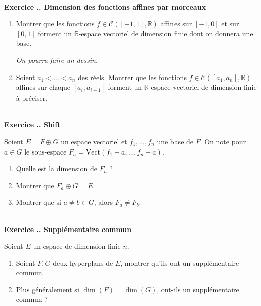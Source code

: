 \documentclass{article}
\newcommand{\mb}[1]{\mathbb{#1}}
\newcommand{\mc}[1]{\mathcal{#1}}
\newcounter{exo}
\newcommand{\exercice}[1][\null]{\textbf{\\ Exercice \thesection.\theexo. #1} \addtocounter{exo}{1}}
\begin{document}
\exercice[Dimension des fonctions affines par morceaux]

\begin{enumerate}

\item Montrer que les fonctions $f \in \mc{C}([-1,1], \mb{R})$ affines sur $[-1,0]$ et sur $[0,1]$ forment un $\mb{R}$-espace vectoriel de dimension finie dont on donnera une base.

\emph{On pourra faire un dessin.}

\item Soient $a_1 < \dots <a_n$ des réels. Montrer que les fonctions $f \in \mc{C}([a_1,a_n], \mb{R})$ affines sur chaque $[a_i, a_{i+1}]$ forment un $\mb{R}$-espace vectoriel de dimension finie à préciser.

\end{enumerate}


\exercice[Shift]

Soient $E = F \oplus G$ un espace vectoriel et $f_1, \dots, f_n$ une base de $F$. On note pour $a \in G$ le sous-espace $F_a = \text{Vect}(f_1 +a, \dots, f_n + a)$.

\begin{enumerate}

\item Quelle est la dimension de $F_a$ ?

\item Montrer que $F_a \oplus G = E$.

\item Montrer que si $a \neq b \in G$, alors $F_a \neq F_b$.

\end{enumerate}




\exercice[Supplémentaire commun]

Soient $E$ un espace de dimension finie $n$.

\begin{enumerate}

\item Soient $F,G$ deux hyperplans de $E$, montrer qu'ils ont un supplémentaire commun.

\item Plus généralement si $\dim(F) = \dim(G)$, ont-ils un supplémentaire commun ?

\end{enumerate}
\end{document}
